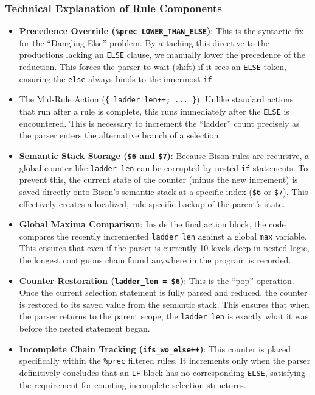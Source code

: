 \documentclass[a4paper,12pt]{article}
\begin{document}
\subsubsection*{Technical Explanation of Rule Components}

\begin{itemize}
    \item \textbf{Precedence Override (\texttt{\%prec LOWER\_THAN\_ELSE})}: This is the syntactic fix for the ``Dangling Else'' problem. By attaching this directive to the productions lacking an \texttt{ELSE} clause, we manually lower the precedence of the reduction. This forces the parser to wait (shift) if it sees an \texttt{ELSE} token, ensuring the \texttt{else} always binds to the innermost \texttt{if}.
    
    \item The Mid-Rule Action (\texttt{\{ ladder\_len++; ... \}}): Unlike standard actions that run after a rule is complete, this runs immediately after the \texttt{ELSE} is encountered. This is necessary to increment the ``ladder'' count precisely as the parser enters the alternative branch of a selection.
    
    \item \textbf{Semantic Stack Storage (\texttt{\$6} and \texttt{\$7})}: Because Bison rules are recursive, a global counter like \texttt{ladder\_len} can be corrupted by nested \texttt{if} statements. To prevent this, the current state of the counter (minus the new increment) is saved directly onto Bison's semantic stack at a specific index (\texttt{\$6} or \texttt{\$7}). This effectively creates a localized, rule-specific backup of the parent's state.
    
    \item \textbf{Global Maxima Comparison}: Inside the final action block, the code compares the recently incremented \texttt{ladder\_len} against a global \texttt{max} variable. This ensures that even if the parser is currently 10 levels deep in nested logic, the longest contiguous chain found anywhere in the program is recorded.
    
    \item \textbf{Counter Restoration (\texttt{ladder\_len = \$6})}: This is the ``pop'' operation. Once the current selection statement is fully parsed and reduced, the counter is restored to its saved value from the semantic stack. This ensures that when the parser returns to the parent scope, the \texttt{ladder\_len} is exactly what it was before the nested statement began.
    
    \item \textbf{Incomplete Chain Tracking (\texttt{ifs\_wo\_else++})}: This counter is placed specifically within the \texttt{\%prec} filtered rules. It increments only when the parser definitively concludes that an \texttt{IF} block has no corresponding \texttt{ELSE}, satisfying the requirement for counting incomplete selection structures.
\end{itemize}
\end{document}
